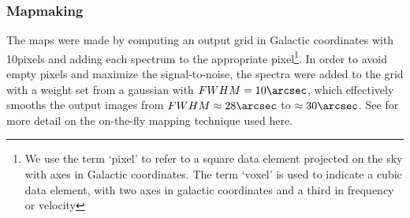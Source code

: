% 
% 


\subsubsection{Mapmaking}
The maps were made by computing an output grid in Galactic coordinates with
10\arcsec pixels and adding each spectrum to the appropriate pixel\footnote{We
use the term `pixel' to refer to a square data element projected on the sky
with axes in Galactic coordinates.  The term `voxel' is used to indicate a cubic data
element, with two axes in galactic coordinates and a third in frequency or
velocity}.  In order
to avoid empty pixels and maximize the signal-to-noise, the spectra were added
to the grid with a weight set from a gaussian with $FWHM=10\arcsec$, which
effectively smooths the output images from $FWHM\approx28\arcsec$ to
$\approx30\arcsec$.  See \citet{Mangum2007a} for more detail on the on-the-fly
mapping technique used here.

